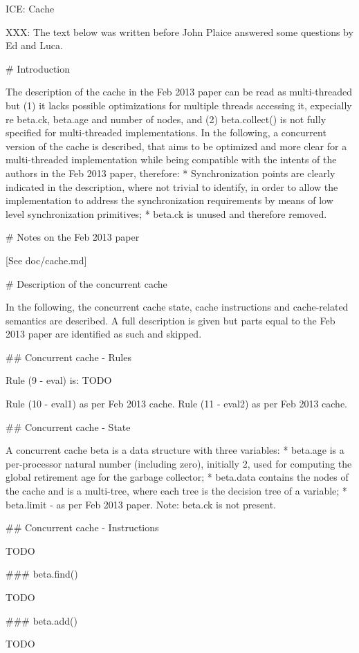 \documentclass{article}
\begin{document}
ICE: Cache

XXX: The text below was written before John Plaice answered some questions by Ed and Luca.


# Introduction

The description of the cache in the Feb 2013 paper can be read as multi-threaded but (1) it lacks possible optimizations for multiple threads accessing it, expecially re beta.ck, beta.age and number of nodes, and (2) beta.collect() is not fully specified for multi-threaded implementations.
In the following, a concurrent version of the cache is described, that aims to be optimized and more clear for a multi-threaded implementation while being compatible with the intents of the authors in the Feb 2013 paper, therefore:
* Synchronization points are clearly indicated in the description, where not trivial to identify, in order to allow the implementation to address the synchronization requirements by means of low level synchronization primitives;
* beta.ck is unused and therefore removed.


# Notes on the Feb 2013 paper

[See doc/cache.md]


# Description of the concurrent cache

In the following, the concurrent cache state, cache instructions and cache-related semantics are described.
A full description is given but parts equal to the Feb 2013 paper are identified as such and skipped.

## Concurrent cache - Rules

Rule (9 - eval) is:
TODO

Rule (10 - eval1) as per Feb 2013 cache.
Rule (11 - eval2) as per Feb 2013 cache.

## Concurrent cache - State

A concurrent cache beta is a data structure with three variables:
* beta.age is a per-processor natural number (including zero), initially 2, used for computing the global retirement age for the garbage collector;
* beta.data contains the nodes of the cache and is a multi-tree, where each tree is the decision tree of a variable;
* beta.limit - as per Feb 2013 paper.
Note: beta.ck is not present.

## Concurrent cache - Instructions

TODO

### beta.find()

TODO

### beta.add()

TODO
\end{document}
